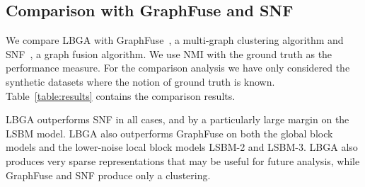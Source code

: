 \documentclass{article}
\begin{document}
\subsection{Comparison with GraphFuse and SNF}
\label{sec:comparison}
We compare LBGA with GraphFuse~\cite{Papalexakis2013}, a multi-graph clustering
algorithm and SNF~\cite{Wang14}, a graph fusion algorithm. We use NMI with the
ground truth as the performance measure. For the comparison analysis we have
only considered the synthetic datasets where the notion of ground truth is
known. Table~\ref{table:results} contains the comparison results. 

LBGA outperforms SNF in all cases, and by a particularly large margin on the
LSBM model. LBGA also outperforms GraphFuse on both the global block models and the
lower-noise local block models LSBM-2 and LSBM-3. LBGA also produces very
sparse representations that may be useful for future analysis, while GraphFuse
and SNF produce only a clustering.
\end{document}
